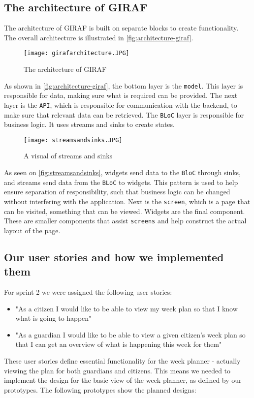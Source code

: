 \subsection{The architecture of GIRAF}
The architecture of GIRAF is built on separate blocks to create functionality. 
The overall architecture is illustrated in \autoref{fig:architecture-giraf}.
\begin{figure}[h]
  \centering
  \texttt{[image: girafarchitecture.JPG]}
  \caption{The architecture of GIRAF}
  \label{fig:architecture-giraf}
\end{figure}
As shown in \autoref{fig:architecture-giraf}, the bottom layer is the \texttt{model}.
This layer is responsible for data, making sure what is required can be provided.
The next layer is the \texttt{API}, which is responsible for communication with the backend, to make sure that relevant data can be retrieved.
The \texttt{BLoC} layer is responsible for business logic. 
It uses streams and sinks to create states.
\begin{figure}[h]
  \centering
  \texttt{[image: streamsandsinks.JPG]}
  \caption{A visual of streams and sinks}
  \label{fig:streamsandsinks}
\end{figure}

As seen on \autoref{fig:streamsandsinks}, widgets send data to the \texttt{BloC} through sinks, and streams send data from the \texttt{BLoC} to widgets.
This pattern is used to help ensure separation of responsibility, such that business logic can be changed without interfering with the application.  
Next is the \texttt{screen}, which is a page that can be visited, something that can be viewed.
Widgets are the final component.
These are smaller components that assist \texttt{screens} and help construct the actual layout of the page. 

\subsection{Our user stories and how we implemented them}
For sprint 2 we were assigned the following user stories:

\begin{itemize}
    \item "As a citizen I would like to be able to view my week plan so that I know what is going to happen"
    \item "As a guardian I would like to be able to view a given citizen's week plan so that I can get an overview of what is happening this week for them"
\end{itemize}
These user stories define essential functionality for the week planner - actually viewing the plan for both guardians and citizens.
This means we needed to implement the design for the basic view of the week planner, as defined by our prototypes.
The following prototypes show the planned designs:

